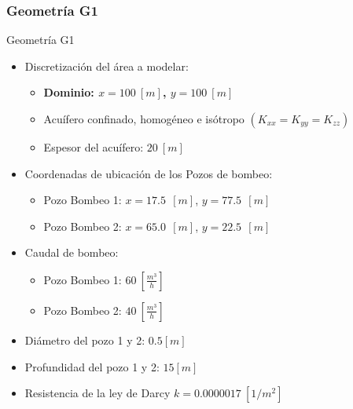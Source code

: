 \documentclass[spanish]{beamer}
\begin{document}
\subsubsection{Geometría G1}
\begin{frame}{Geometría G1}
\begin{itemize}
	\item Discretización del área a modelar:	
	\begin{itemize}
		\item \textbf{Dominio: $x=100 ~\left[m\right]$, $y=100 ~\left[m\right]$}
		\item Acuífero confinado, homogéneo e isótropo $(K_{xx} = K_{yy} = K_{zz})$
		\item Espesor del acuífero: $20 ~\left[m\right]$
	\end{itemize}
	\item Coordenadas de ubicación de los Pozos de bombeo:
	\begin{itemize}
		\item Pozo Bombeo 1: $x=17.5~~\left[m\right]$, $y=77.5 ~~\left[m\right]$
		\item Pozo Bombeo 2: $x=65.0~~\left[m\right]$, $y=22.5 ~~\left[m\right]$
	\end{itemize}
	\item Caudal de bombeo:
	\begin{itemize}
		\item Pozo Bombeo 1: $60~\left[\frac{m^3}{h}\right]$
		\item Pozo Bombeo 2: $40~\left[\frac{m^3}{h}\right]$
	\end{itemize}
	\item Diámetro del pozo 1 y 2: $0.5 [m]$
	\item Profundidad del pozo 1 y 2: $15 [m]$
	\item Resistencia de la ley de Darcy $k=0.0000017~[1/m^2]$
\end{itemize}
\end{frame}
%
\end{document}
